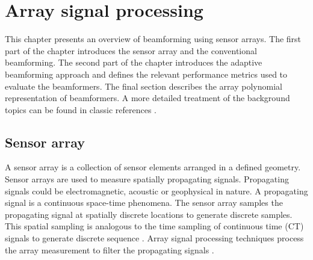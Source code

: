 \chapter{Array signal processing}
\label{ch:lit-rev}
This chapter presents an overview of beamforming using sensor
arrays. The first part of the chapter introduces the sensor array and
the conventional beamforming. The second part of the chapter
introduces the adaptive beamforming approach and defines the relevant
performance metrics used to evaluate the beamformers. The final
section describes the array polynomial representation of
beamformers. A more detailed treatment of the background topics can be
found in classic references \cite{vtree2002oap,johnson1992array}.

\section{Sensor array}
\label{sec:sensor_array} 
A sensor array is a collection of sensor elements arranged in a
defined geometry. Sensor arrays are used to measure spatially
propagating signals. Propagating signals could be electromagnetic,
acoustic or geophysical in nature. A propagating signal is a continuous space-time phenomena. The
sensor array samples the propagating signal at spatially discrete
locations to generate discrete samples. This spatial sampling is
analogous to the time sampling of continuous time (CT) signals to
generate discrete sequence \cite{Oppenheim1989}. Array signal
processing techniques process the array measurement to filter
the propagating signals \cite{johnson1992array, vtree2002oap}.


